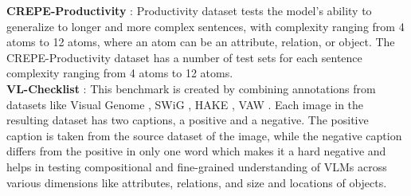 \documentclass[11pt]{article}
\begin{document}
\noindent \textbf{CREPE-Productivity} \cite{ma2022crepe}: Productivity dataset tests the model's ability to generalize to longer and more complex sentences, with complexity ranging from 4 atoms to 12 atoms, where an atom can be an attribute, relation, or object. The CREPE-Productivity dataset has a number of test sets for each sentence complexity ranging from 4 atoms to 12 atoms.\\
\noindent \textbf{VL-Checklist} \cite{zhao2022vlchecklist}: This benchmark is created by combining annotations from datasets like Visual Genome \citep{krishnavisualgenome}, SWiG \citep{swig}, HAKE \citep{hake}, VAW \citep{vaw}. Each image in the resulting dataset has two captions, a positive and a negative. The positive caption is taken from the source dataset of the image, while the negative caption differs from the positive in only one word which makes it a hard negative and helps in testing compositional and fine-grained understanding of VLMs across various dimensions like attributes, relations, and size and locations of objects.\\
\end{document}
